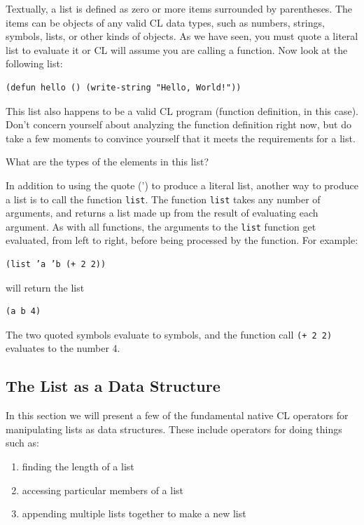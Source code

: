 \documentclass [11pt]{book}
\begin{document}
Textually, a list is defined as zero or more items surrounded by
parentheses. The items can be objects of any valid CL data types,
such as numbers, strings, symbols, lists, or other kinds of
objects. As we have seen, you must quote a literal list to evaluate it
or CL will assume you are calling a function. Now look at the
following list:

\begin{verbatim}(defun hello () (write-string "Hello, World!"))
\end{verbatim}This list also happens to be a valid CL program (function definition,
in this case). Don't concern yourself about analyzing the function definition
right now, but do take a few moments to convince yourself that it
meets the requirements for a list.



What are the types of the elements in this list?



In addition to using the quote (') to produce a literal list, another
way to produce a list is to call the function \texttt{list}. The function \texttt{list} takes any number of arguments, and returns a list made up
from the result of evaluating each argument. As with all functions,
the arguments to the \texttt{list} function get evaluated, from left to right, before being
processed by the function. For example:

\begin{verbatim}(list ’a ’b (+ 2 2))
\end{verbatim}will return the list

\begin{verbatim}(a b 4)
\end{verbatim}The two quoted symbols evaluate to symbols, and the function
call \texttt{(+ 2 2)} evaluates to the number 4.



\subsection{The List as a Data Structure}

\label{subsec:thelistasadatastructure}

In this section we will present a few of the fundamental native CL operators for manipulating
lists as data structures. These include operators for doing things such as:

\begin{enumerate}

\item finding the length of a list

\item accessing particular members of a list

\item appending multiple lists together to make a new list

\end{enumerate}
\end{document}

